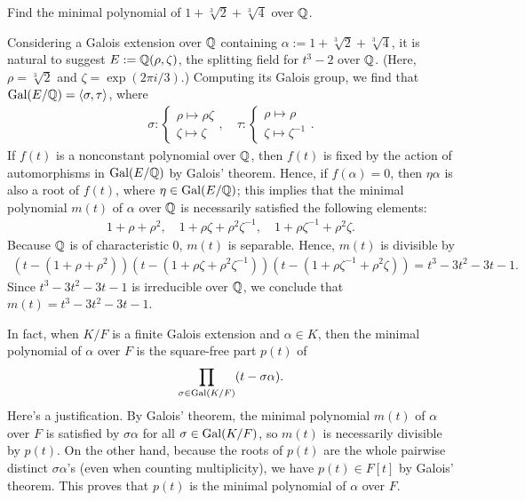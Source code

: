 \begin{prob}
    Find the minimal polynomial of $1+\sqrt[3]{2}+\sqrt[3]{4}$ over ${\mathbb{Q}}$.
\end{prob}
\begin{sol}
    Considering a Galois extension over ${\mathbb{Q}}$ containing $\alpha:=1+\sqrt[3]{2}+\sqrt[3]{4}$, it is natural to suggest $E:={\mathbb{Q}}(\rho, \zeta)$, the splitting field for $t^3-2$ over ${\mathbb{Q}}$. (Here, $\rho=\sqrt[3]{2}$ and $\zeta=\exp(2\pi i/3)$.)
    Computing its Galois group, we find that ${\textrm{Gal}({E/{\mathbb{Q}}})}={\left\langle{\sigma, \tau}\right\rangle}$, where
    \begin{align*}
        \sigma:\left\{\begin{array}{c}
            \rho\mapsto\rho\zeta\\
            \zeta\mapsto\zeta
        \end{array}\right.,\quad
        \tau:\left\{\begin{array}{c}
            \rho\mapsto\rho\\
            \zeta\mapsto\zeta^{-1}
        \end{array}\right..
    \end{align*}
    If $f(t)$ is a nonconstant polynomial over ${\mathbb{Q}}$, then $f(t)$ is fixed by the action of automorphisms in ${\textrm{Gal}({E/{\mathbb{Q}}})}$ by Galois' theorem.
    Hence, if $f(\alpha)=0$, then $\eta\alpha$ is also a root of $f(t)$, where $\eta\in{\textrm{Gal}({E/{\mathbb{Q}}})}$; this implies that the minimal polynomial $m(t)$ of $\alpha$ over ${\mathbb{Q}}$ is necessarily satisfied the following elements:
    \begin{align*}
        1+\rho+\rho^2,\quad 1+\rho\zeta+\rho^2\zeta^{-1},\quad 1+\rho\zeta^{-1}+\rho^2\zeta.
    \end{align*}
    Because ${\mathbb{Q}}$ is of characteristic 0, $m(t)$ is separable.
    Hence, $m(t)$ is divisible by
    \begin{align*}
        (t-(1+\rho+\rho^2))(t-(1+\rho\zeta+\rho^2\zeta^{-1}))(t-(1+\rho\zeta^{-1}+\rho^2\zeta))=t^3-3t^2-3t-1.
    \end{align*}
    Since $t^3-3t^2-3t-1$ is irreducible over ${\mathbb{Q}}$, we conclude that $m(t)=t^3-3t^2-3t-1$.
\end{sol}
\begin{rmk}
    In fact, when $K/F$ is a finite Galois extension and $\alpha\in K$, then the minimal polynomial of $\alpha$ over $F$ is the square-free part $p(t)$ of
    \begin{align*}
        \prod_{\sigma\in{\textrm{Gal}({K/F})}}(t-\sigma\alpha).
    \end{align*}
    Here's a justification.
    By Galois' theorem, the minimal polynomial $m(t)$ of $\alpha$ over $F$ is satisfied by $\sigma\alpha$ for all $\sigma\in{\textrm{Gal}({K/F})}$, so $m(t)$ is necessarily divisible by $p(t)$.
    On the other hand, because the roots of $p(t)$ are the whole pairwise distinct $\sigma\alpha$'s (even when counting multiplicity), we have $p(t)\in F[t]$ by Galois' theorem.
    This proves that $p(t)$ is the minimal polynomial of $\alpha$ over $F$.
\end{rmk}
